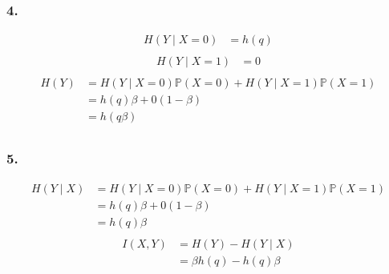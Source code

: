 \documentclass{article}
\newcommand{\1}{\mathbf{1}}
\renewcommand{\P}{\mathbb{P}}
\begin{document}
\subsubsection{4.}
\begin{align*}
  H(Y \mid X = 0)
   & = h(q) \\
\end{align*}
\begin{align*}
  H(Y \mid X = 1)
   & = 0 \\
\end{align*}
\begin{align*}
  H(Y)
   & = H(Y \mid X = 0) \P(X = 0) + H(Y \mid X = 1) \P(X = 1) \\
   & = h(q) \beta + 0 (1 - \beta)                            \\
   & = h(q\beta)                                             \\
\end{align*}

\subsubsection{5.}
\begin{align*}
  H(Y \mid X)
   & = H(Y \mid X = 0) \P(X = 0) + H(Y \mid X = 1) \P(X = 1) \\
   & = h(q) \beta + 0 (1 - \beta)                            \\
   & = h(q) \beta                                            \\
\end{align*}
\begin{align*}
  I(X, Y)
   & = H(Y) - H(Y \mid X)     \\
   & = \beta h(q) - h(q)\beta \\
\end{align*}
\end{document}
